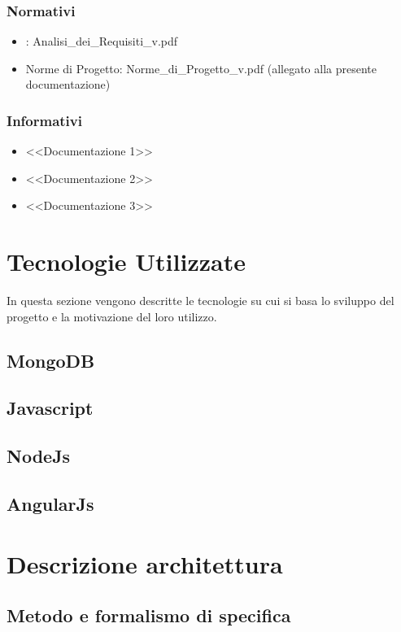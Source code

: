 \subsubsection{Normativi}
\label{1.4.1}
\begin{itemize}
\item {}: Analisi\_{}dei\_{}Requisiti\_{}v\versioneNormeDiProgetto{}.pdf
\item Norme di Progetto: Norme\_{}di\_{}Progetto\_{}v\versioneNormeDiProgetto{}.pdf  (allegato alla presente documentazione)\\
\end{itemize}

\subsubsection{Informativi}
\label{1.4.2}
\begin{itemize}
\item <<Documentazione 1>>
\item <<Documentazione 2>>
\item <<Documentazione 3>>
\end{itemize}

\newpage
\section{Tecnologie Utilizzate}%
In questa sezione vengono descritte le tecnologie su cui si basa lo sviluppo del progetto e la motivazione del loro utilizzo.
\subsection{MongoDB} %
\subsection{Javascript} %
\subsection{NodeJs} %
\subsection{AngularJs} %

\newpage
\section{Descrizione architettura}%
\subsection{Metodo e formalismo di speciﬁca} %
